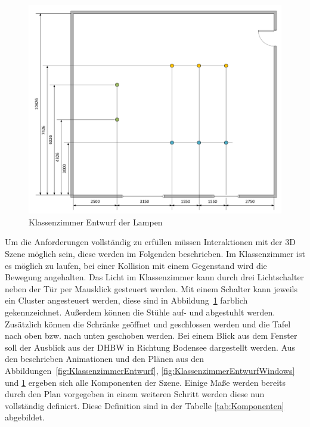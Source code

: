 \begin{figure}[H]
  \centering
  \includegraphics[width=1\textwidth]{images/classroom_draw_lamps.pdf}
  \caption{Klassenzimmer Entwurf der Lampen}
  \label{fig:KlassenzimmerEntwurfLamps}
\end{figure}\noindent
Um die Anforderungen vollständig zu erfüllen müssen Interaktionen mit der 3D Szene möglich sein, diese werden im Folgenden beschrieben.
\newparagraph
Im Klassenzimmer ist es möglich zu laufen, bei einer Kollision mit einem Gegenstand wird die Bewegung angehalten.
Das Licht im Klassenzimmer kann durch drei Lichtschalter neben der Tür per Mausklick gesteuert werden. Mit einem Schalter kann jeweils ein Cluster angesteuert werden, diese sind in Abbildung~\ref{fig:KlassenzimmerEntwurfLamps}
farblich gekennzeichnet.
Außerdem können die Stühle auf- und abgestuhlt werden. 
Zusätzlich können die Schränke geöffnet und geschlossen werden und die Tafel nach oben bzw. nach unten geschoben werden.
Bei einem Blick aus dem Fenster soll der Ausblick aus der DHBW in Richtung Bodensee dargestellt werden. 
\newparagraph
Aus den beschrieben Animationen und den Plänen aus den Abbildungen~\ref{fig:KlassenzimmerEntwurf}, \ref{fig:KlassenzimmerEntwurfWindows} und \ref{fig:KlassenzimmerEntwurfLamps} ergeben sich alle Komponenten der Szene. 
Einige Maße werden bereits durch den Plan vorgegeben in einem weiteren Schritt werden diese nun vollständig definiert.
Diese Definition sind in der Tabelle \ref{tab:Komponenten} abgebildet.
